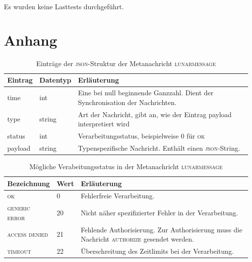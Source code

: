 \documentclass[ngerman,11pt]{report}
\begin{document}
Es wurden keine Lasttests durchgeführt.

\chapter{Anhang}

\begin{table}[]
\centering
\caption{Einträge der \textsc{json}-Struktur der Metanachricht \textsc{lunarmessage}}
\label{table:lunarmessage}
\begin{tabularx}{\textwidth}{l|l|X}
Eintrag & Datentyp & Erläuterung \\ \hline
time    & int    & Eine bei null beginnende Ganzzahl. Dient der Synchronisation der Nachrichten. \\
type    & string & Art der Nachricht, gibt an, wie der Eintrag payload interpretiert wird  \\
status  & int    & Verarbeitungsstatus, beispielweise 0 für \textsc{ok}                          \\
payload & string & Typenspezifische Nachricht. Enthält einen \textsc{json}-String.       
\end{tabularx}
\end{table}


\begin{table}[]
\centering
\caption{Mögliche Verabeitungsstatus in der Metanachricht \textsc{lunarmessage}}
\label{table:messagesStatus}
\begin{tabularx}{\textwidth}{l|l|X}
Bezeichnung            & Wert & Erläuterung \\ \hline
\textsc{ok}            & 0    & Fehlerfreie Verarbeitung. \\
\textsc{generic error} & 20   & Nicht näher spezifizierter Fehler in der Verarbeitung.  \\
\textsc{access denied} & 21   & Fehlende Authorisierung. Zur Authorisierung muss die
                                Nachricht \textsc{authorize} gesendet werden. \\
\textsc{timeout}       & 22   & Überschreitung des Zeitlimits bei der Verarbeitung.
\end{tabularx}
\end{table}
\end{document}
